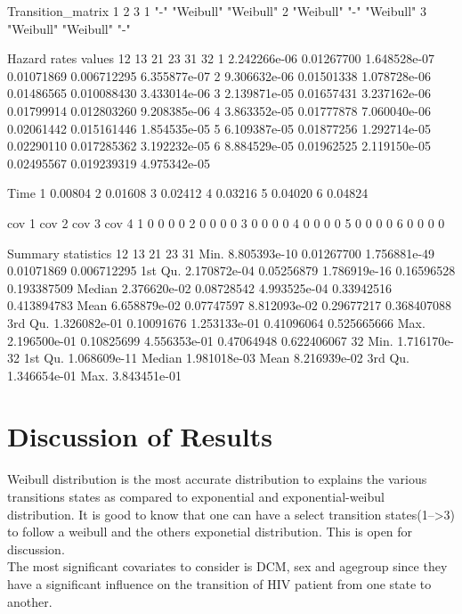 \documentclass[11pt,a4paper]{article}
\begin{document}
\begin{Schunk}
\begin{Soutput}
Transition_matrix
  1         2         3        
1 "-"       "Weibull" "Weibull"
2 "Weibull" "-"       "Weibull"
3 "Weibull" "Weibull" "-"      

Hazard rates values 
            12         13           21         23          31           32
1 2.242266e-06 0.01267700 1.648528e-07 0.01071869 0.006712295 6.355877e-07
2 9.306632e-06 0.01501338 1.078728e-06 0.01486565 0.010088430 3.433014e-06
3 2.139871e-05 0.01657431 3.237162e-06 0.01799914 0.012803260 9.208385e-06
4 3.863352e-05 0.01777878 7.060040e-06 0.02061442 0.015161446 1.854535e-05
5 6.109387e-05 0.01877256 1.292714e-05 0.02290110 0.017285362 3.192232e-05
6 8.884529e-05 0.01962525 2.119150e-05 0.02495567 0.019239319 4.975342e-05

     Time
1 0.00804
2 0.01608
3 0.02412
4 0.03216
5 0.04020
6 0.04824

  cov 1 cov 2 cov 3 cov 4
1     0     0     0     0
2     0     0     0     0
3     0     0     0     0
4     0     0     0     0
5     0     0     0     0
6     0     0     0     0

Summary statistics
                  12         13           21         23          31
Min.    8.805393e-10 0.01267700 1.756881e-49 0.01071869 0.006712295
1st Qu. 2.170872e-04 0.05256879 1.786919e-16 0.16596528 0.193387509
Median  2.376620e-02 0.08728542 4.993525e-04 0.33942516 0.413894783
Mean    6.658879e-02 0.07747597 8.812093e-02 0.29677217 0.368407088
3rd Qu. 1.326082e-01 0.10091676 1.253133e-01 0.41096064 0.525665666
Max.    2.196500e-01 0.10825699 4.556353e-01 0.47064948 0.622406067
                  32
Min.    1.716170e-32
1st Qu. 1.068609e-11
Median  1.981018e-03
Mean    8.216939e-02
3rd Qu. 1.346654e-01
Max.    3.843451e-01
\end{Soutput}
\end{Schunk}

  
\section{Discussion of Results}

Weibull distribution is the most accurate distribution to explains the various transitions states as compared to exponential and exponential-weibul distribution. It is good to know that one can have a select transition states(1-->3) to follow a weibull and the others exponetial distribution. This is open for discussion.\\
The most significant covariates to consider is DCM, sex and agegroup since they have a significant influence on the transition of HIV patient from one state to another.
\end{document}
